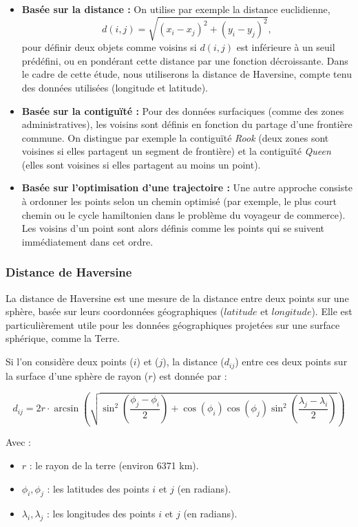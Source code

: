 \documentclass[
]{article}
\begin{document}
\begin{itemize}
  \item \textbf{Basée sur la distance :}  
  On utilise par exemple la distance euclidienne,
  $$
  d(i,j) = \sqrt{(x_i - x_j)^2 + (y_i - y_j)^2},
  $$
pour définir deux objets comme voisins si \(d(i,j)\) est inférieure à un seuil prédéfini, ou en pondérant cette distance par une fonction décroissante. Dans le cadre de cette étude, nous utiliserons la distance de Haversine, compte tenu des données utilisées (longitude et latitude).

\item \textbf{Basée sur la contiguïté :}  
  Pour des données surfaciques (comme des zones administratives), les voisins sont définis en fonction du partage d'une frontière commune. On distingue par exemple la contiguïté \emph{Rook} (deux zones sont voisines si elles partagent un segment de frontière) et la contiguïté \emph{Queen} (elles sont voisines si elles partagent au moins un point).
  
  \item \textbf{Basée sur l'optimisation d'une trajectoire :}  
  Une autre approche consiste à ordonner les points selon un chemin optimisé (par exemple, le plus court chemin ou le cycle hamiltonien dans le problème du voyageur de commerce). Les voisins d'un point sont alors définis comme les points qui se suivent immédiatement dans cet ordre.
\end{itemize}

\subsubsection{Distance de Haversine}\label{distance-de-haversine}

La distance de Haversine est une mesure de la distance entre deux points
sur une sphère, basée sur leurs coordonnées géographiques (\(latitude\)
et \(longitude\)). Elle est particulièrement utile pour les données
géographiques projetées sur une surface sphérique, comme la Terre.

Si l'on considère deux points (\(i\)) et (\(j\)), la distance
(\(d_{ij}\)) entre ces deux points sur la surface d'une sphère de rayon
(\(r\)) est donnée par :

\[
 d_{ij} = 2r \cdot \arcsin\left(\sqrt{\sin^2\left(\frac{\phi_j - \phi_i}{2}\right) + \cos(\phi_i)\cos(\phi_j)\sin^2\left(\frac{\lambda_j - \lambda_i}{2}\right)}\right)
\]

Avec :

\begin{itemize}
\item
  \(r\) : le rayon de la terre (environ 6371 km).
\item
  \(\phi_i, \phi_j\) : les latitudes des points \(i\) et \(j\) (en
  radians).
\item
  \(\lambda_i, \lambda_j\) : les longitudes des points \(i\) et \(j\)
  (en radians).
\end{itemize}
\end{document}
